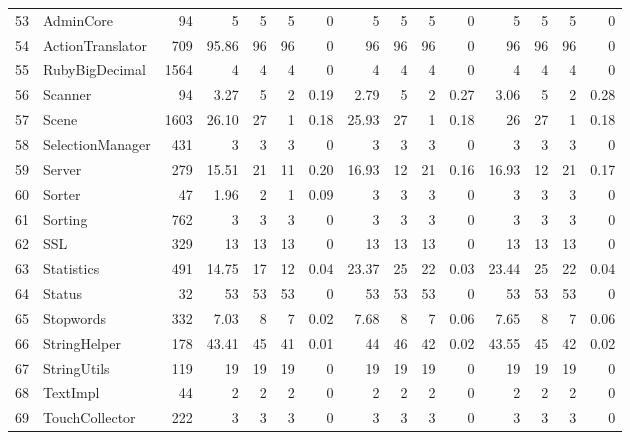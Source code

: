 \documentclass{acm_proc_article-sp}
\begin{document}
\begin{table} [htp!]
{\begin{tabularx}{1.2 \textwidth}{r l r r r r r r r r r r r r r}
 53						& AdminCore					&94	& 5	&	5	&	5	& 		0					& 5		& 5 		& 5		& 		0			& 5			& 5			& 5			&	0\\      
 54						& ActionTranslator				&709	& 95.86&	96	&	96	& 		0					& 96		& 96 		& 96		& 		0			& 96			& 96			& 96			&	0\\      
 55						& RubyBigDecimal				&1564	& 4 	&	4	&	4	& 		0					& 4		& 4 		& 4		& 		0			& 4			& 4			& 4			&	0\\      
 56						& Scanner					&94	& 3.27&	5	&	2	& 		0.19					& 2.79	& 5 		& 2		& 		0.27			& 3.06		& 5			& 2			&	0.28\\      
 57						& Scene						&1603	& 26.10&	27	&	1	& 		0.18					& 25.93	& 27 		& 1		& 		0.18			& 26			& 27			& 1			&	0.18\\      
 58						& SelectionManager				&431	& 3	&	3	&	3	& 		0					& 3		& 3 		& 3		& 		0			& 3			& 3			& 3			&	0\\      
 59						& Server						&279	& 15.51&	21	&	11	& 		0.20					& 16.93	& 12 		& 21		& 		0.16			& 16.93		& 12			& 21			&	0.17\\      
 60						& Sorter						&47	& 1.96&	2	&	1	& 		0.09					& 	3	& 3 		& 3		& 		0			& 3			& 3			& 3			&	0\\      
 61						& Sorting						&762	& 3	&	3	&	3	& 		0					& 	3	& 3 		& 3		& 		0			& 3			& 3			& 3			&	0\\      
 62						& SSL						&329	&13	&	13	&	13	& 		0					& 13		& 13 		& 13		& 		0			& 13			& 13			& 13			&	0\\      
 63						& Statistics					&491	& 14.75&	17	&	12	&	 	0.04					& 23.37	& 25 		& 22		& 		0.03			& 23.44		& 25			& 22			&	0.04\\      
 64						& Status						&32	& 53	&	53	&	53	& 		0					& 53		& 53 		& 53		& 		0			& 53			& 53			& 53			&	0\\      
 65						& Stopwords					&332	& 7.03&	8	&	7	& 		0.02					& 7.68	&  8		& 7		& 		0.06			& 7.65		& 8			& 7			&	0.06\\      
 66						& StringHelper					&178	& 43.41& 45	&	41	& 		0.01					& 44		&  46		& 42		& 		0.02			& 43.55		& 45			& 42			&	0.02\\      
 67						& StringUtils					&119	&19 	&	19	&	19	& 		0					& 19		& 19 		& 19		& 		0			& 19			& 19			& 19			&	0\\      
 68						& TextImpl					&44	& 2 	&	2	&	2	& 		0					& 2		&  2		& 2		& 		0			& 2			& 2			& 2			&	0\\      
 69						& TouchCollector				&222	& 3	&	3	&	3	& 		0					& 3		&  3		& 3		& 		0			& 3			& 3			& 3			&	0\\      

\end{tabularx}}
\end{table}
\end{document}
